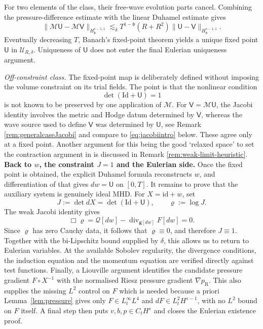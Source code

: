 \documentclass[11pt,reqno]{amsart}
\theoremstyle{plain}
\theoremstyle{definition}
\theoremstyle{remark}
\numberwithin{equation}{section}
\DeclareMathOperator{\Div}{div}
\newcommand{\breg}{\mathfrak b}
\newcommand{\Ufield}{\mathsf U}
\newcommand{\Vfield}{\mathsf V}
\newcommand{\gmetric}{\mathbf g}
\begin{document}
For two elements of the class, their free-wave evolution parts cancel. Combining the
pressure-difference estimate with the linear Duhamel estimate gives
\[
 \|\mathcal M\Ufield-\mathcal M\Vfield\|_{H_{\breg}^{s-1,1}}
 \lesssim_\delta
 T^{1-\breg}(R+R^2)
 \|\Ufield-\Vfield\|_{H_{\breg}^{s-1,1}}.
\]
Eventually decreasing $T$, Banach's fixed-point
theorem yields a unique fixed point  $\Ufield$ in $\mathcal U_{R,\delta}$.  Uniqueness of $\Ufield$ does not enter the final Eulerian uniqueness argument.

\textit{Off-constraint class.} The fixed-point map is deliberately defined without imposing the volume
constraint on its trial fields. The point is that
the nonlinear condition
\[
 \det(\mathrm{Id}+\Ufield)=1
\]
is not known to be preserved by one application of $\mathcal M$. For
$\Vfield=\mathcal M\Ufield$, the Jacobi identity involves the metric and
Hodge datum determined by $\Vfield$, whereas the wave source used to define
$\Vfield$ was determined by $\Ufield$, see Remark \ref{rem:generalcaseJacobi} and compare to \eqref{eq:jacobiintro} below. These agree only at a fixed point. Another argument for this being the good `relaxed space' to set the contraction argument in is discussed in Remark \ref{rem:weak-limit-heuristic}.\\

\textbf{Back to $w$, the constraint $J=1$ and the Eulerian side.}
Once the fixed point is obtained, the explicit Duhamel formula reconstructs $w$,
and differentiation of that gives $dw=\Ufield$ on $[0,T]$. It remains
to prove that the auxiliary system is genuinely ideal MHD. For $X=\mathrm{id}+w$, set
\[
 J:=\det dX=\det(\mathrm{Id}+\Ufield),
 \qquad
 \varrho:=\log J.
\]
The weak Jacobi identity gives
\begin{equation}\label{eq:jacobiintro}
    \Box\varrho
 =\mathcal Q[dw]
  -\Div_{\gmetric[dw]}F[dw]
 =0.
\end{equation}
Since $\varrho$ has zero Cauchy data, it follows that
$\varrho\equiv0$, and therefore $J\equiv1$.
Together with the bi-Lipschitz bound supplied by $\delta$, this allows us to
return to Eulerian variables. At the available Sobolev regularity, the divergence conditions, the induction equation and the momentum equation are verified directly against test functions. Finally, a Liouville argument identifies the candidate pressure gradient
$F\circ X^{-1}$ with the normalised
Riesz pressure gradient $\nabla p_{\mathrm R}$. This also supplies the missing $L^2$ control on $F$ which is needed
because a priori Lemma~\ref{lem:pressure} gives only $F\in L^\infty_tL^4$ and
$dF\in L^2_tH^{s-1}$, with no $L^2$ bound on $F$ itself. A final step then puts $v,b,p\in C_tH^s$ and closes the Eulerian existence proof.\\
\end{document}
